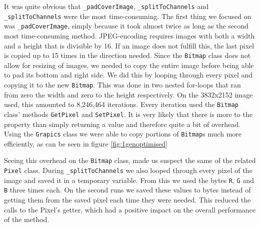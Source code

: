 It was quite obvious that \lstinline|_padCoverImage|, \lstinline|_splitToChannels| and \lstinline|_splitToChannels| were the most time-consuming.
The first thing we focused on was \lstinline|_padCoverImage|, simply because it took almost twice as long as the second most time-consuming method.
JPEG-encoding requires images with both a width and a height that is divisible by 16.
If an image does not fulfill this, the last pixel is copied up to 15 times in the direction needed.
Since the \lstinline|Bitmap| class does not allow for resizing of images, we needed to copy the entire image before being able to pad its bottom and right side.
We did this by looping through every pixel and copying it to the new \lstinline|Bitmap|.
This was done in two nested for-loops that ran from zero the width and zero to the height respectively.
On the 3832x2152 image used, this amounted to 8,246,464 iterations. 
Every iteration used the \lstinline|Bitmap| class' methods \lstinline|GetPixel| and \lstinline|SetPixel|.
It is very likely that there is more to the property than simply returning a value and therefore quite a bit of overhead.
Using the \lstinline|Grapics| class we were able to copy portions of \lstinline|Bitmap|s much more efficiently,\citep{MSDNBitmap} as can be seen in figure \ref{fig:1genoptimised}

Seeing this overhead on the \lstinline|Bitmap| class, made us suspect the same of the related \lstinline|Pixel| class. 
During \lstinline|_splitToChannels| we also looped through every pixel of the image and saved it in a temporary variable. 
From this we used the bytes \lstinline|R|, \lstinline|G| and \lstinline|B| three times each. 
On the second runs we saved these values to bytes instead of getting them from the saved pixel each time they were needed.
This reduced the calls to the Pixel's getter, which had a positive impact on the overall performance of the method.

